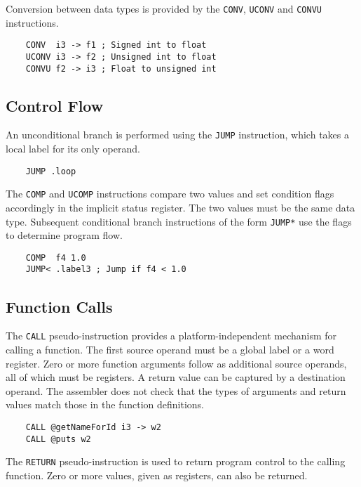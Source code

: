 Conversion between data types is provided by the
\texttt{CONV}, \texttt{UCONV} and \texttt{CONVU} instructions.

\begin{verbatim}
    CONV  i3 -> f1 ; Signed int to float
    UCONV i3 -> f2 ; Unsigned int to float
    CONVU f2 -> i3 ; Float to unsigned int
\end{verbatim}

\subsection{Control Flow}

An unconditional branch is performed using the \texttt{JUMP} instruction, which
takes a local label for its only operand.

\begin{verbatim}
    JUMP .loop
\end{verbatim}

The \texttt{COMP} and \texttt{UCOMP} instructions compare two values and set condition flags
accordingly in the implicit status register. The two values must be the same data type.
Subsequent conditional branch instructions of the
form \texttt{JUMP*} use the flags to determine program flow.

\begin{verbatim}
    COMP  f4 1.0
    JUMP< .label3 ; Jump if f4 < 1.0
\end{verbatim}

\subsection{Function Calls}

The \texttt{CALL} pseudo-instruction provides a platform-independent
mechanism for calling a function. The first source operand must be
a global label or a word register. Zero or more function arguments follow as
additional source operands, all of which must be registers. A return value can be captured
by a destination operand.
The assembler does not check that the types of arguments and return values match those
in the function definitions.

\begin{verbatim}
    CALL @getNameForId i3 -> w2
    CALL @puts w2
\end{verbatim}

The \texttt{RETURN} pseudo-instruction is used to return program
control to the calling function. Zero or more values, given
as registers, can also be returned.

